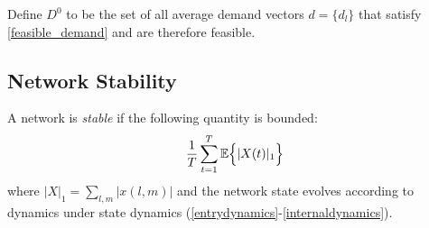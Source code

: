 Define $D^0$ to be the set of all average demand vectors $d=\{d_l\}$ that satisfy \eqref{feasible_demand} and are therefore feasible.

\subsection*{Network Stability}
A network is \emph{stable} if the following quantity is bounded:
\begin{equation} \label{stability_condition}
 \dfrac{1}{T}\sum_{t=1}^{T}\expectation{\vert X(t) \vert_{1}}
 \end{equation}
where $\vert X\vert_{1} = \sum_{l,m} \vert x(l,m)\vert$ and the network state evolves according to dynamics under state dynamics (\ref{entrydynamics}-\ref{internaldynamics}).



